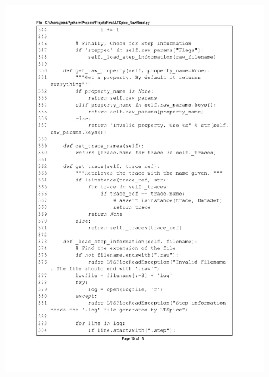 \begin{figure}[]
\centering
\includegraphics[scale=0.9]{01_Pre_textuais/code/leitura10.pdf}
\end{figure}

